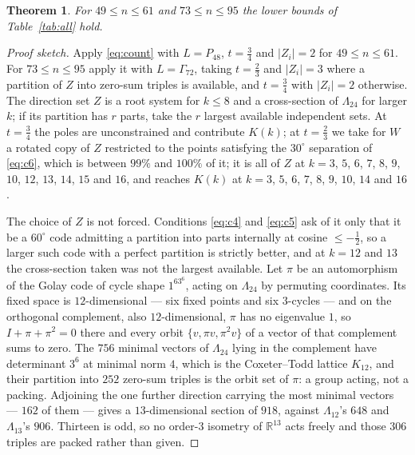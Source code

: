 \documentclass[11pt]{amsart}
\newtheorem{theorem}{Theorem}[section]
\theoremstyle{remark}
\newcommand{\Leech}{\Lambda_{24}}
\newcommand{\Pff}{P_{48}}
\newcommand{\Gsz}{\Gamma_{72}}
\newcommand{\R}{\mathbb{R}}
\begin{document}
\begin{theorem}\label{thm:big}
For $49\le n\le61$ and $73\le n\le95$ the lower bounds of
Table~\ref{tab:all} hold.
\end{theorem}

\begin{proof}[Proof sketch]
Apply \eqref{eq:count} with $L=\Pff$, $t=\tfrac34$ and $|Z_i|=2$ for
$49\le n\le61$. For $73\le n\le95$ apply it with $L=\Gsz$, taking $t=\tfrac23$
and $|Z_i|=3$ where a partition of $Z$ into zero-sum triples is available, and
$t=\tfrac34$ with $|Z_i|=2$ otherwise. The direction set $Z$ is a root system for
$k\le8$ and a cross-section of $\Leech$ for larger $k$; if its partition has $r$
parts, take the $r$ largest available independent sets. At $t=\tfrac34$ the poles
are unconstrained and contribute $K(k)$; at $t=\tfrac23$ we take for $W$ a rotated
copy of $Z$ restricted to the points satisfying the $30^\circ$ separation of
\eqref{eq:c6}, which is between $99\%$ and $100\%$ of it;
it is all of $Z$ at $k=3$, $5$, $6$, $7$, $8$, $9$, $10$, $12$, $13$, $14$, $15$ and
$16$,
and reaches $K(k)$ at $k=3$, $5$, $6$, $7$, $8$, $9$, $10$, $14$ and $16$.

The choice of $Z$ is not forced. Conditions \eqref{eq:c4} and \eqref{eq:c5} ask of it
only that it be a $60^\circ$ code admitting a partition into parts internally at cosine
$\le-\tfrac12$, so a larger such code with a perfect partition is strictly better, and at
$k=12$ and $13$ the cross-section taken was not the largest available. Let $\pi$ be an
automorphism of the Golay code of cycle shape $1^63^6$, acting on $\Leech$ by permuting
coordinates. Its fixed space is $12$-dimensional --- six fixed points and six $3$-cycles ---
and on the orthogonal complement, also $12$-dimensional, $\pi$ has no eigenvalue $1$, so
$I+\pi+\pi^2=0$ there and every orbit $\{v,\pi v,\pi^2v\}$ of a vector of that complement
sums to zero. The $756$ minimal vectors of $\Leech$ lying in the complement have
determinant $3^6$ at minimal norm $4$, which is the Coxeter--Todd lattice $K_{12}$, and
their partition into $252$ zero-sum triples is the orbit set of $\pi$: a group acting, not
a packing. Adjoining the one further direction carrying the most minimal vectors --- $162$
of them --- gives a $13$-dimensional section of $918$, against $\Lambda_{12}$'s $648$ and
$\Lambda_{13}$'s $906$. Thirteen is odd, so no order-$3$ isometry of $\R^{13}$ acts freely
and those $306$ triples are packed rather than given.


\end{proof}
\end{document}

